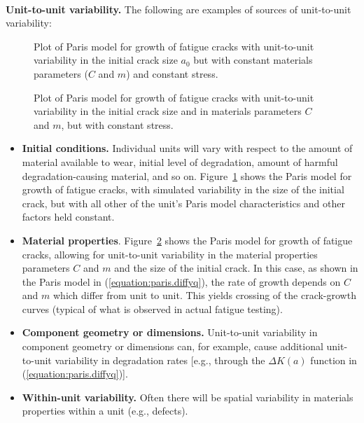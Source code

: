 \mbox{  }\\
\noindent
{\bf Unit-to-unit variability.}
The following are examples of sources of unit-to-unit variability:
\begin{figure}
\caption{Plot of Paris model for growth of fatigue cracks
with unit-to-unit variability in the initial crack size $a_{0}$ but
with constant materials parameters ($C$ and $m$) and constant stress.}
\label{figure:paris.degradation.fixedm.ps}
\end{figure}
\begin{figure}
\caption{Plot of Paris model for growth of fatigue cracks
with unit-to-unit variability in the initial crack size and in
materials parameters $C$ and $m$, but with constant stress.}
\label{figure:paris.degradation.stochm.ps}
\end{figure}
\begin{itemize}
\item
{\bfseries Initial conditions.} Individual units will vary with
respect to the amount of material available to wear, initial level of
degradation, amount of harmful degradation-causing material, and so
on.  Figure~\ref{figure:paris.degradation.fixedm.ps} shows the Paris
model for growth of fatigue cracks, with simulated variability in the
size of the initial crack, but with all other of the unit's Paris model
characteristics and other factors held
constant.
\item
{\bf Material properties}.
Figure~\ref{figure:paris.degradation.stochm.ps} shows the Paris model
for growth of fatigue cracks, allowing for unit-to-unit variability in
the material properties parameters $C$ and $m$ and the size of the
initial crack. In this case, as shown in the Paris model in
(\ref{equation:paris.diffyq}), the rate of growth depends on $C$ and
$m$ which differ from unit to unit. This yields crossing of the
crack-growth curves (typical of what is observed in actual fatigue
testing).
\item
{\bf Component geometry or dimensions.} Unit-to-unit variability in
component geometry or dimensions can, for example, cause additional
unit-to-unit variability in degradation rates [e.g., through the
$\Delta K(a)$ function in (\ref{equation:paris.diffyq})].
\item
{\bf Within-unit variability.} Often there will be spatial
variability in materials properties within a unit (e.g., defects).
\end{itemize}

